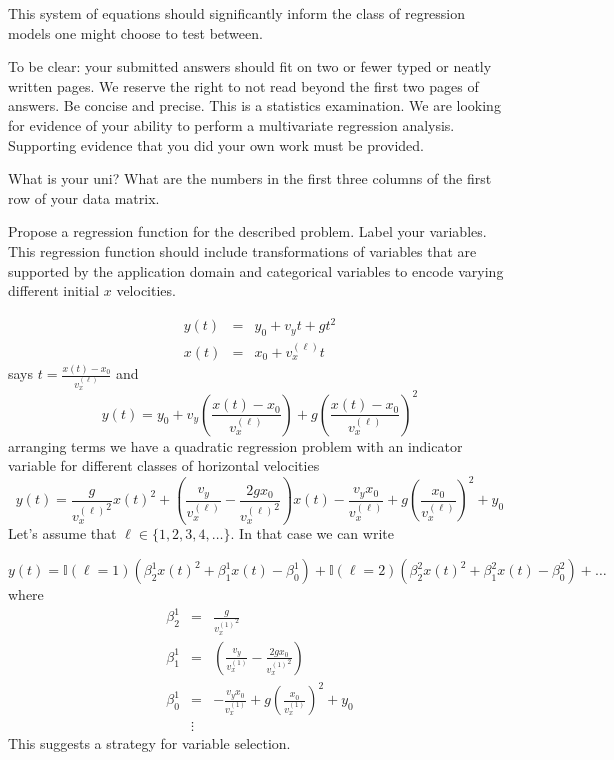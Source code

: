 \documentclass[12pt]{article}
\begin{document}
This system of equations should significantly inform the class of regression models one might choose to test between. \newline

To be clear: your submitted answers should fit on two or fewer typed or neatly written pages.  We reserve the right to not read beyond the first two pages of answers. Be concise and precise.  This is a statistics examination.  We are looking for evidence of your ability to perform a multivariate regression analysis.  Supporting evidence that you did your own work must be provided.\newline

{
What is your uni?  What are the numbers in the first three columns of the first row of your data matrix.
}
 { \vfill \answer } %
 {  %
 }
 
 
{
Propose a regression function for the described problem.  Label your variables.  This regression function should include transformations of variables that are supported by the application domain and categorical variables to encode varying different initial $x$ velocities.
}
 { \vfill \answer } %
 {  %
 
 \begin{eqnarray*}
y(t) &=& y_0 + v_y  t + g t^2 \\
x(t) &=& x_0 + v_x^{(\ell)} t
\end{eqnarray*}
says $t = \frac{x(t)-x_0}{v_x^{(\ell)}}$
and
\[y(t) =y_0 + v_y  \left( \frac{x(t)-x_0}{v_x^{(\ell)}}\right) + g \left( \frac{x(t)-x_0}{v_x^{(\ell)}}\right)^2\]
arranging terms we have a quadratic regression problem with an indicator variable for different classes of horizontal velocities
\[y(t) =\frac{g}{{v_x^{(\ell)}}^2}{x(t)}^2 + \left(\frac{v_y }{v_x^{(\ell)}} -\frac{2g x_0}{{v_x^{(\ell)}}^2}\right)x(t) -\frac{v_y x_0}{v_x^{(\ell)}} + g \left(\frac{x_0}{v_x^{(\ell)}}\right)^2 +y_0\]
Let's assume that $\ell \in \{1,2,3,4,\ldots\}$.  In that case we can write 

\[y(t) = \mathbb{I}(\ell = 1) (\beta_2^1 {x(t)}^2 + \beta_1^1 x(t) - \beta_0^1) +  \mathbb{I}(\ell = 2) (\beta_2^2{x(t)}^2 + \beta_1^2 x(t) - \beta_0^2) + \ldots\]
where
\begin{eqnarray*}
\beta_2^1&=& \frac{g}{{v_x^{(1)}}^2} \\
\beta_1^1&=&  \left(\frac{v_y }{v_x^{(1)}} -\frac{2g x_0}{{v_x^{(1)}}^2}\right) \\
 \beta_0^1 &=& -\frac{v_y x_0}{v_x^{(1)}} + g \left(\frac{x_0}{v_x^{(1)}}\right)^2 +y_0\\
 &\vdots&
\end{eqnarray*}
This suggests a strategy for variable selection.  
 }
\end{document}
